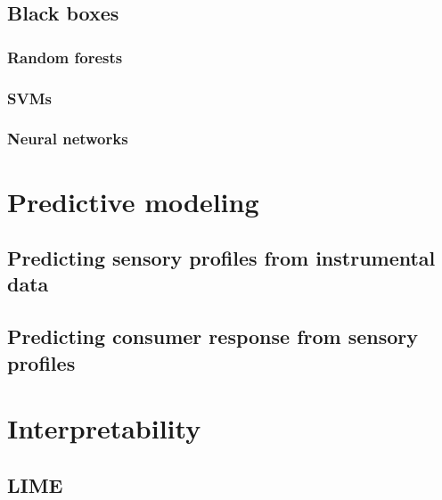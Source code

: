 \documentclass[
]{book}
\begin{document}
\hypertarget{black-boxes}{%
\subsection{Black boxes}\label{black-boxes}}

\hypertarget{random-forests}{%
\subsubsection{Random forests}\label{random-forests}}

\hypertarget{svms}{%
\subsubsection{SVMs}\label{svms}}

\hypertarget{neural-networks}{%
\subsubsection{Neural networks}\label{neural-networks}}

\hypertarget{predictive-modeling}{%
\section{Predictive modeling}\label{predictive-modeling}}

\hypertarget{predicting-sensory-profiles-from-instrumental-data}{%
\subsection{Predicting sensory profiles from instrumental data}\label{predicting-sensory-profiles-from-instrumental-data}}

\hypertarget{predicting-consumer-response-from-sensory-profiles}{%
\subsection{Predicting consumer response from sensory profiles}\label{predicting-consumer-response-from-sensory-profiles}}

\hypertarget{interpretability}{%
\section{Interpretability}\label{interpretability}}

\hypertarget{lime}{%
\subsection{LIME}\label{lime}}
\end{document}

